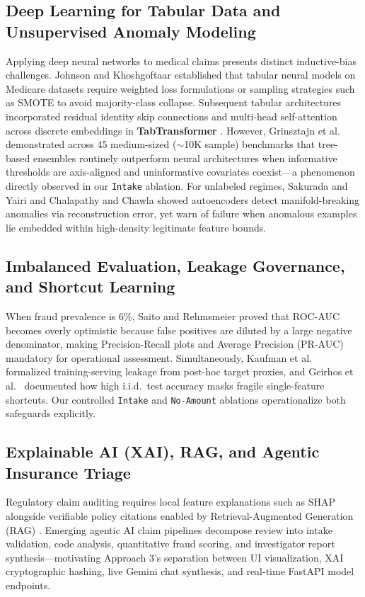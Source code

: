 \documentclass[12pt]{article}
\begin{document}
\subsection{Deep Learning for Tabular Data and Unsupervised Anomaly Modeling}
Applying deep neural networks to medical claims presents distinct inductive-bias challenges. Johnson and Khoshgoftaar \cite{johnson2019medicare} established that tabular neural models on Medicare datasets require weighted loss formulations or sampling strategies such as SMOTE \cite{chawla2002smote} to avoid majority-class collapse. Subsequent tabular architectures incorporated residual identity skip connections \cite{he2016deep, gorishniy2021revisiting} and multi-head self-attention across discrete embeddings in \textbf{TabTransformer} \cite{huang2020tabtransformer}. However, Grinsztajn et al.\ \cite{grinsztajn2022tree} demonstrated across 45 medium-sized ($\sim$10K sample) benchmarks that tree-based ensembles routinely outperform neural architectures when informative thresholds are axis-aligned and uninformative covariates coexist—a phenomenon directly observed in our \texttt{Intake} ablation. For unlabeled regimes, Sakurada and Yairi \cite{sakurada2014anomaly} and Chalapathy and Chawla \cite{chalapathy2019deep} showed autoencoders detect manifold-breaking anomalies via reconstruction error, yet warn of failure when anomalous examples lie embedded within high-density legitimate feature bounds.

\subsection{Imbalanced Evaluation, Leakage Governance, and Shortcut Learning}
When fraud prevalence is $6\%$, Saito and Rehmsmeier \cite{saito2015precision} proved that ROC-AUC becomes overly optimistic because false positives are diluted by a large negative denominator, making Precision-Recall plots and Average Precision (PR-AUC) mandatory for operational assessment. Simultaneously, Kaufman et al.\ \cite{kaufman2012leakage} formalized training-serving leakage from post-hoc target proxies, and Geirhos et al.\ \cite{geirhos2020shortcut} documented how high i.i.d.\ test accuracy masks fragile single-feature shortcuts. Our controlled \texttt{Intake} and \texttt{No-Amount} ablations operationalize both safeguards explicitly.

\subsection{Explainable AI (XAI), RAG, and Agentic Insurance Triage}
Regulatory claim auditing requires local feature explanations such as SHAP \cite{lundberg2017unified} alongside verifiable policy citations enabled by Retrieval-Augmented Generation (RAG) \cite{lewis2020retrieval}. Emerging agentic AI claim pipelines decompose review into intake validation, code analysis, quantitative fraud scoring, and investigator report synthesis—motivating Approach 3's separation between UI visualization, XAI cryptographic hashing, live Gemini chat synthesis, and real-time FastAPI model endpoints.
\end{document}
